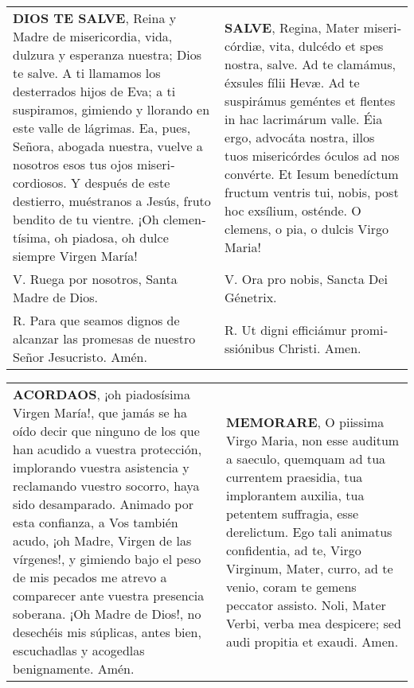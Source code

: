\documentclass[./rosary.tex]{subfiles}
\begin{document}
\label{hailMaryQueen}
\begin{longtable} { p{} p{} }
    \textbf{DIOS TE SALVE}, Reina y Madre de mi­se­ri­cordia, vida, dulzura y esperanza nuestra; Dios te salve.
    A ti llamamos los desterrados hijos de Eva; a ti suspiramos, gimiendo y llorando en este valle de lágrimas.
    Ea, pues, Señora, abogada nuestra, vuelve a nosotros esos tus ojos mi­se­ri­cordiosos. Y después de este destierro, muéstranos a Jesús,
    fruto bendito de tu vientre. ¡Oh cle­men­tísima, oh piadosa, oh dulce siempre Virgen María!

                                                                                          &

    \textbf{SALVE}, Regina, Mater mi­se­ri­córdiæ, vita, dulcédo et spes nostra, salve. Ad te clamámus, éxsules fílii Hevæ.
    Ad te suspirámus geméntes et flentes in hac lacrimárum valle. Éia ergo, advocáta nostra, illos tuos mi­se­ri­córdes óculos ad nos convérte.
    Et Iesum benedíctum fructum ventris tui, nobis, post hoc exsílium, osténde. O clemens, o pia, o dulcis Virgo Maria!            \\

    V. Ruega por nosotros, Santa Madre de Dios.                                           & V. Ora pro nobis, Sancta Dei Génetrix. \\

    R. Para que seamos dignos de alcanzar las promesas de nuestro Señor Jesucristo. Amén. &
    R. Ut digni efficiámur pro­mi­ssiónibus Christi. Amen.
\end{longtable}

\begin{longtable} { p{} p{} }
    \textbf{ACORDAOS}, ¡oh piadosísima Virgen María!, que jamás se ha oído decir que ninguno de los que han acudido a vuestra protección,
    implorando vuestra asistencia y reclamando vuestro socorro, haya sido desamparado. Animado por esta confianza, a Vos también acudo,
    ¡oh Madre, Virgen de las vírgenes!, y gimiendo bajo el peso de mis pecados me atrevo a comparecer ante vuestra presencia soberana.
    ¡Oh Madre de Dios!, no desechéis mis súplicas, antes bien, escuchadlas y acogedlas benignamente. Amén.

    &
    
    \textbf{MEMORARE}, O piissima Virgo Maria, non esse auditum a saeculo, quemquam ad tua currentem praesidia, tua implorantem auxilia, 
    tua petentem suffragia, esse derelictum. Ego tali animatus confidentia, ad te, Virgo Virginum, Mater, curro, ad te venio, coram te gemens 
    peccator assisto. Noli, Mater Verbi, verba mea despicere; sed audi propitia et exaudi. Amen. 
\end{longtable}
\end{document}
